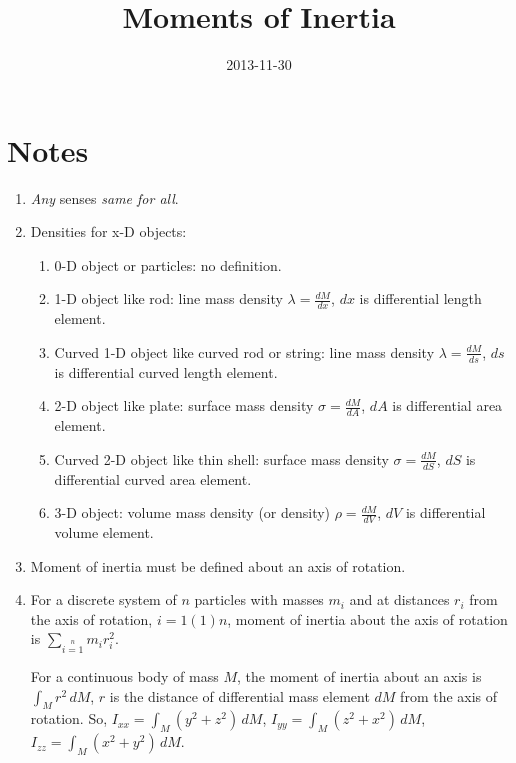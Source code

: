 \documentclass[a4paper,10pt]{article}
\title{Moments of Inertia}
\author{}
\date{2013-11-30}
\begin{document}
\maketitle
\section*{Notes}
\begin{enumerate}
\item \emph{Any} senses \emph{same for all}.
\item Densities for x-D objects:
\begin{enumerate}
\item 0-D object or particles: no definition.
\item 1-D object like rod: line mass density $\lambda=\frac{dM}{dx}$, $dx$ is differential length element.
\item Curved 1-D object like curved rod or string: line mass density $\lambda=\frac{dM}{ds}$, $ds$ is differential curved length element.
\item 2-D object like plate: surface mass density $\sigma=\frac{dM}{dA}$, $dA$ is differential area element.
\item Curved 2-D object like thin shell: surface mass density $\sigma=\frac{dM}{dS}$, $dS$ is differential curved area element.
\item 3-D object: volume mass density (or density) $\rho=\frac{dM}{dV}$, $dV$ is differential volume element.
\end{enumerate}
\item Moment of inertia must be defined about an axis of rotation.
\item For a discrete system of $n$ particles with masses $m_i$ and at distances $r_i$ from the axis of rotation, $i=1(1)n$, moment of inertia about the axis of rotation is $\sum\limits_{i=1}\limits^n m_i r_i^2$.

For a continuous body of mass $M$, the moment of inertia about an axis is $\int_M r^2 \,dM$, $r$ is the distance of differential mass element $dM$ from the axis of rotation.
So, $I_{xx} = \int_M (y^2+z^2) \,dM$, $I_{yy} = \int_M (z^2+x^2) \,dM$, $I_{zz} = \int_M (x^2+y^2) \,dM$.
\end{enumerate}
\end{document}
